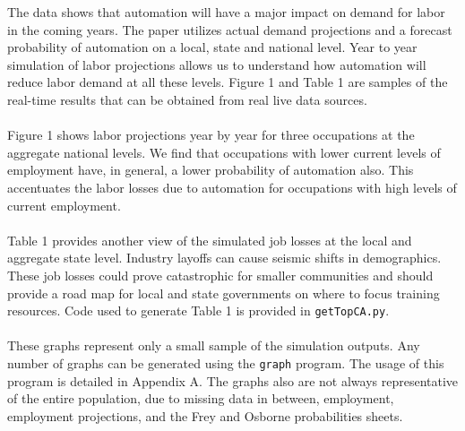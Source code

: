 \documentclass[10pt]{article}
\begin{document}
The data shows that automation will have a major impact on demand for labor in the coming years. The paper utilizes actual demand projections and a forecast probability of automation on a local, state and national level. Year to year simulation of labor projections allows us to understand how automation will reduce labor demand at all these levels. Figure 1 and Table 1 are samples of the real-time results that can be obtained from real live data sources.\\\\ Figure 1 shows labor projections year by year for three occupations at the aggregate national levels. We find that occupations with lower current levels of employment have, in general, a lower probability of automation also. This accentuates the labor losses due to automation for occupations with high levels of current employment.\\\\ Table 1 provides another view of the simulated job losses at the local and aggregate state level. Industry layoffs can cause seismic shifts in demographics. These job losses could prove catastrophic for smaller communities and should provide a road map for local and state governments on where to focus training resources. Code used to generate Table 1 is provided in \texttt{getTopCA.py}.\\\\ These graphs represent only a small sample of the simulation outputs. Any number of graphs can be generated using the \texttt{graph} program. The usage of this program is detailed in Appendix A. The graphs also are not always representative of the entire population, due to missing data in between, employment, employment projections, and the Frey and Osborne probabilities sheets.
\end{document}
